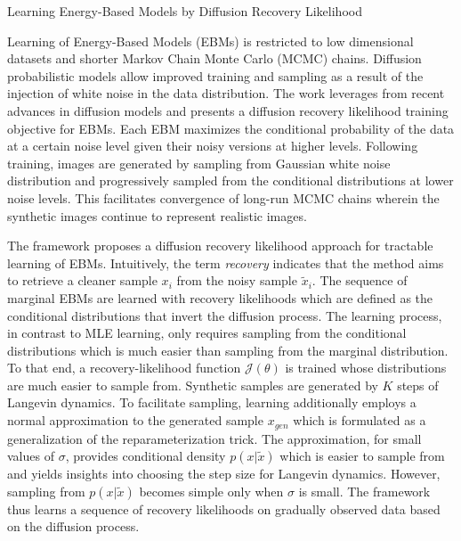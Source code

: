 \documentclass[11pt,letterpaper]{article}
\begin{document}
\begin{center}
  \large{Learning Energy-Based Models by Diffusion Recovery Likelihood}
\end{center}

Learning of Energy-Based Models (EBMs) is restricted to low dimensional datasets and shorter Markov Chain Monte Carlo (MCMC) chains. Diffusion probabilistic models allow improved training and sampling as a result of the injection of white noise in the data distribution. The work leverages from recent advances in diffusion models and presents a diffusion recovery likelihood training objective for EBMs. Each EBM maximizes the conditional probability of the data at a certain noise level given their noisy versions at higher levels. Following training, images are generated by sampling from Gaussian white noise distribution and progressively sampled from the conditional distributions at lower noise levels. This facilitates convergence of long-run MCMC chains wherein the synthetic images continue to represent realistic images. 

The framework proposes a diffusion recovery likelihood approach for tractable learning of EBMs. Intuitively, the term \textit{recovery} indicates that the method aims to retrieve a cleaner sample $x_{i}$ from the noisy sample $\tilde{{x}}_{i}$. The sequence of marginal EBMs are learned with recovery likelihoods which are defined as the conditional distributions that invert the diffusion process. The learning process, in contrast to MLE learning, only requires sampling from the conditional distributions which is much easier than sampling from the marginal distribution. To that end, a recovery-likelihood function $\mathcal{J}(\theta)$ is trained whose distributions are much easier to sample from. Synthetic samples are generated by $K$ steps of Langevin dynamics. To facilitate sampling, learning additionally employs a normal approximation to the generated sample $x_{gen}$ which is formulated as a generalization of the reparameterization trick. The approximation, for small values of $\sigma$, provides conditional density $p(x|\tilde{x})$ which is easier to sample from and yields insights into choosing the step size for Langevin dynamics. However, sampling from $p(x|\tilde{x})$ becomes simple only when $\sigma$ is small. The framework thus learns a sequence of recovery likelihoods on gradually observed data based on the diffusion process. 
\end{document}
